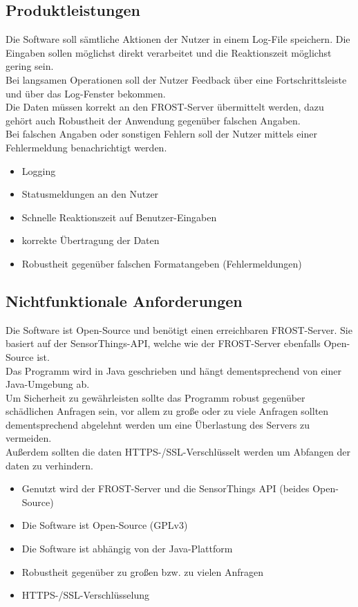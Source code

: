 \documentclass[12 pt]{article}
\begin{document}
	\subsection{Produktleistungen}
	Die Software soll sämtliche Aktionen der Nutzer in einem Log-File speichern. Die Eingaben sollen möglichst direkt verarbeitet und die Reaktionszeit möglichst gering sein. \\Bei langsamen Operationen soll der Nutzer Feedback über eine Fortschrittsleiste und über das Log-Fenster bekommen. \\
	Die Daten müssen korrekt an den FROST-Server übermittelt werden, dazu gehört auch Robustheit der Anwendung gegenüber falschen Angaben. \\Bei falschen Angaben oder sonstigen Fehlern soll der Nutzer mittels einer Fehlermeldung benachrichtigt werden.
	\begin{itemize}
		\item Logging
		\item Statusmeldungen an den Nutzer
		\item Schnelle Reaktionszeit auf Benutzer-Eingaben
		\item korrekte Übertragung der Daten
		\item Robustheit gegenüber falschen Formatangeben (Fehlermeldungen)
	\end{itemize}
	
	\subsection{Nichtfunktionale Anforderungen}
	Die Software ist Open-Source und benötigt einen erreichbaren FROST-Server. Sie basiert auf der SensorThings-API, welche wie der FROST-Server ebenfalls Open-Source ist.
	\\Das Programm wird in Java geschrieben und hängt dementsprechend von einer Java-Umgebung ab.
	\\Um Sicherheit zu gewährleisten sollte das Programm robust gegenüber schädlichen Anfragen sein, vor allem zu große oder zu viele Anfragen sollten dementsprechend abgelehnt werden um eine Überlastung des Servers zu vermeiden.
	\\Außerdem sollten die daten HTTPS-/SSL-Verschlüsselt werden um Abfangen der daten zu verhindern.
	
	\begin{itemize}
		\item Genutzt wird der FROST-Server und die SensorThings API (beides Open-Source)
		\item Die Software ist Open-Source (GPLv3)
		\item Die Software ist abhängig von der Java-Plattform
		\item Robustheit gegenüber zu großen bzw. zu vielen Anfragen 		
		\item HTTPS-/SSL-Verschlüsselung								
	\end{itemize}
	
\end{document}
